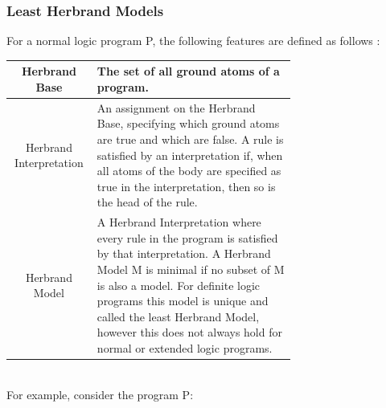 \subsubsection{Least Herbrand Models}
For a normal logic program P, the following features are defined as follows \cite{KRnotes} :

\begin{center}
\begin{tabular}{| c | m{0.7\linewidth} |}
\hline
Herbrand Base & 
\mbox{}\newline
The set of all ground atoms of a program.\newline
\\
\hline
Herbrand Interpretation & 
\mbox{}\newline
An assignment on the Herbrand Base, specifying which ground atoms are true and which are false.\newline \newline
A rule is satisfied by an interpretation if, when all atoms of the body are specified as true in the interpretation, then so is the head of the rule.\newline
\\
\hline
Herbrand Model & 
\mbox{}\newline
A Herbrand Interpretation where every rule in the program is satisfied by that interpretation.\newline \newline
A Herbrand Model M is minimal if no subset of M is also a model. For definite logic programs this model is unique and called the least Herbrand Model, however this does not always hold for normal or extended logic programs.\newline
\\
\hline
\end{tabular}
\end{center}
\mbox{}\\
For example, consider the program P:\\

